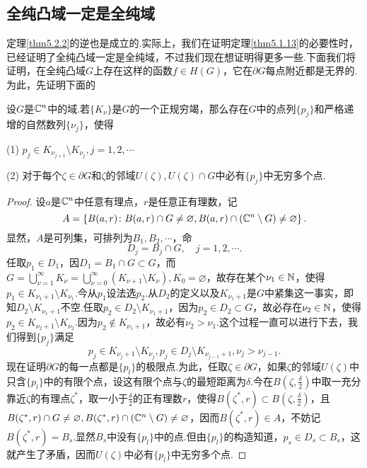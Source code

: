 \subsection{全纯凸域一定是全纯域}
定理\ref{thm5.2.2}的逆也是成立的.实际上，我们在证明定理\ref{thm5.1.13}的必要性时，已经证明了全纯凸域一定是全纯域，不过我们现在想证明得更多一些.下面我们将证明，在全纯凸域$G$上存在这样的函数$f\in H(G)$，它在$\partial G$每点附近都是无界的.为此，先证明下面的
\begin{lemma}\label{lem5.2.3}
	设$G$是$\mathbb C^n$中的域.若$\{K_\nu\}$是$G$的一个正规穷竭，那么存在$G$中的点列$\{p_j\}$和严格递增的自然数列$\{\nu_j\}$，使得
	
	(1)
	$p_j\in K_{\nu_{j+1}}\setminus K_{\nu_j},j=1,2,\cdots$
	
	(2)
	对于每个$\zeta\in\partial G$和$\zeta$的邻域$U(\zeta),U(\zeta)\cap G$中必有$\{p_j\}$中无穷多个点.
\end{lemma}
\begin{proof}
	设$a$是$\mathbb C^n$中任意有理点，$r$是任意正有理数，记
	\[A=\left\{B(a,r)\colon B(a,r)\cap G\neq\varnothing,B(a,r)\cap(\mathbb C^n\setminus G)\neq\varnothing\right\}.\]
	显然，$A$是可列集，可排列为$B_1,B_2,\cdots$，命
	\[D_j=B_j\cap G,\quad j=1,2,\cdots.\]
	任取$p_1\in D_1$，因$D_1=B_1\cap G\subset G$，而$G=\bigcup\limits_{\nu=1}^\infty K_\nu=\bigcup\limits_{\nu=0}^\infty(K_{\nu+1}\setminus K_\nu),K_0=\varnothing$，故存在某个$\nu_1\in\mathbb N$，使得$p_1\in K_{\nu_1+1}\setminus K_{\nu_1}$.今从$p_1$设法选$p_2$.从$D_2$的定义以及$K_{\nu_1+1}$是$G$中紧集这一事实，即知$D_2\setminus K_{\nu_1+1}$不空.任取$p_2\in D_2\setminus K_{\nu_1+1}$，因为$p_2\in D_2\subset G$，故必存在$\nu_2\in\mathbb N$，使得$p_2\in K_{\nu_2+1}\setminus K_{\nu_2}$.因为$p_2\notin K_{\nu_1+1}$，故必有$\nu_2>\nu_1$.这个过程一直可以进行下去，我们得到$\{p_j\}$满足
	\[p_j\in K_{\nu_j+1}\setminus K_{\nu_j},p_j\in D_j\setminus K_{\nu_{j-1}+1},\nu_j>\nu_{j-1}.\]
	现在证明$\partial G$的每一点都是$\{p_l\}$的极限点.为此，任取$\zeta\in\partial G$，如果$\zeta$的邻域$U(\zeta)$中只含$\{p_l\}$中的有限个点，设这有限个点与$\zeta$的最短距离为$\delta$.今在$B\left(\zeta,\frac{\delta}{2}\right)$中取一充分靠近$\zeta$的有理点$\zeta^\ast$，取一小于$\frac{\delta}{2}$的正有理数$r$，使得$B(\zeta^\ast,r)\subset B\left(\zeta,\frac{\delta}{2}\right)$，且$B(\zeta^\ast,r)\cap G\neq\varnothing,B(\zeta^\ast,r)\cap(\mathbb C^n\setminus G)\neq\varnothing$，因而$B(\zeta^\ast,r)\in A$，不妨记$B(\zeta^\ast,r)=B_s$.显然$B_s$中没有$\{p_l\}$中的点.但由$\{p_l\}$的构造知道，$p_s\in D_s\subset B_s$，这就产生了矛盾，因而$U(\zeta)$中必有$\{p_l\}$中无穷多个点.
\end{proof}
